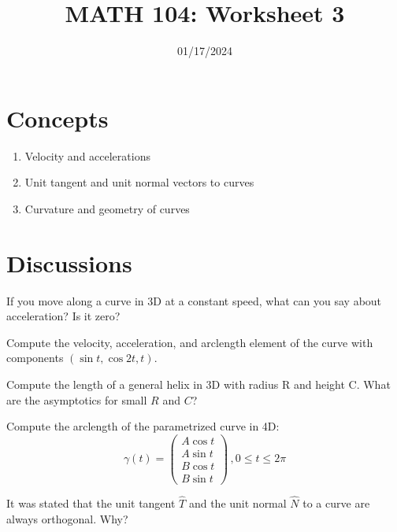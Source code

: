\documentclass[12pt]{amsart}
\title{ MATH 104: Worksheet 3}
\author{}
\date{01/17/2024}
\begin{document}
\maketitle

\section{Concepts}

\begin{enumerate}
    \item Velocity and accelerations
    \item Unit tangent and unit normal vectors to curves
    \item Curvature and geometry of curves
\end{enumerate}

\section{Discussions}

\begin{question}
    If you move along a curve in 3D at a constant speed, what can you say about acceleration? Is it zero?
\end{question}

\begin{question}
    Compute the velocity, acceleration, and arclength element of the curve with components $(\sin t, \cos 2t, t)$.
\end{question}

\begin{question}
    Compute the length of a general helix in 3D with radius R and height C.
    What are the asymptotics for small $R$ and $C$?
\end{question}

\begin{question}
    Compute the arclength of the parametrized curve in 4D:
    \begin{equation*}
        \gamma(t) = \begin{pmatrix}
            A \cos t\\ A\sin t \\ B \cos t  \\ B \sin t
        \end{pmatrix}
        \,, 0 \leq t \leq 2\pi
    \end{equation*}
\end{question}

\begin{question}
    It was stated that the unit tangent $\hat T$ and the unit normal $\hat N$ to a curve
    are always orthogonal. Why?
\end{question}

\printbibliography 
%
%
\end{document}
